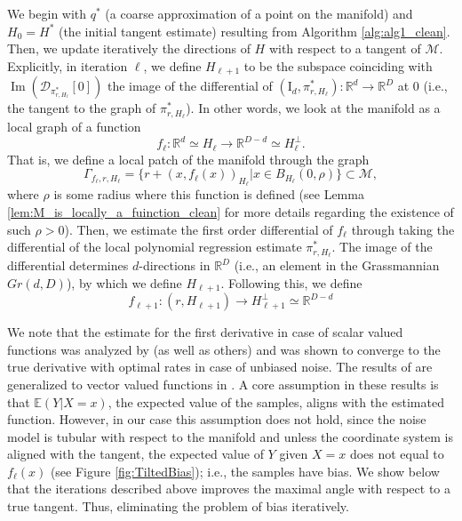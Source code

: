 \documentclass[12pt]{article}
\theoremstyle{remark}
\newcommand{\RR}{\mathbb{R}}
\newcommand{\EE}{\mathbb{E}}
\newcommand{\MM}{\mathcal{M}}
\newcommand{\DD}{\mathcal{D}}
\DeclareMathOperator{\Ima}{Im}
\begin{document}
We begin with $q^*$ (a coarse approximation of a point on the manifold) and $H_0 = H^*$ (the initial tangent estimate) resulting from Algorithm \ref{alg:alg1_clean}.
Then, we update iteratively the directions of $H$ with respect to a tangent of $\MM$.
Explicitly, in iteration $\ell$, we define $H_{\ell+1}$ to be the subspace coinciding with $ \Ima(\DD_{\pi^*_{r, H_{\ell}}}[0]) $ the image of the differential of $(\textrm{I}_d,\pi^*_{r,H_{\ell}}):\RR^d\to\RR^D$ at $ 0 $ (i.e., the tangent to the graph of $ \pi^*_{r, H_{\ell }} $).
In other words, we look at the manifold as a local graph of a function 
\begin{equation}
	f_{\ell}:\RR^d\simeq H_\ell \to \RR^{D-d} \simeq H_\ell ^\perp 
	.\end{equation}
That is, we define a local patch of the manifold through the graph 
\begin{equation}\label{eq:Graph_fl}
	\Gamma_{f_\ell, r, H_\ell} = \{r + (x, f_\ell(x))_{H_\ell} | x\in B_{H_\ell}(0,\rho) \}\subset\MM,   
\end{equation}
where $\rho$ is some radius where this function is defined (see Lemma \ref{lem:M_is_locally_a_fuinction_clean} for more details regarding the existence of such $\rho > 0$). 
Then, we estimate the first order differential of $f_\ell$ through taking the differential of the local polynomial regression estimate $\pi^*_{r,H_{\ell }}$.
The image of the differential determines $d$-directions in $\RR^D$ (i.e., an element in the Grassmannian $Gr(d,D)$), by which we define $H_{\ell+1}$. 
Following this, we define 
\begin{equation}\label{eq:fl_def}
	f_{\ell+1}:(r, H_{\ell+1}) \to H_{\ell+1} ^\perp \simeq \RR^{D-d}    
\end{equation}

We note that the estimate for the first derivative in case of scalar valued functions was analyzed by \cite{stone1980optimal} (as well as others) and was shown to converge to the true derivative with optimal rates in case of unbiased noise. The results of \cite{stone1980optimal} are generalized to vector valued functions in \cite{aizenbud2021VectorEstimation}. 
A core assumption in these results is that $\EE(Y | X=x)$, the expected value of the samples, aligns with the estimated function.
However, in our case this assumption does not hold, since the noise model is tubular with respect to the manifold and unless the coordinate system is aligned with the tangent, the expected value of $Y$ given $X=x$ does not equal to $f_\ell(x)$ (see Figure \ref{fig:TiltedBias}); i.e., the samples have bias.
We show below that the iterations described above improves the maximal angle with respect to a true tangent. 
Thus, eliminating the problem of bias iteratively. 
\end{document}
